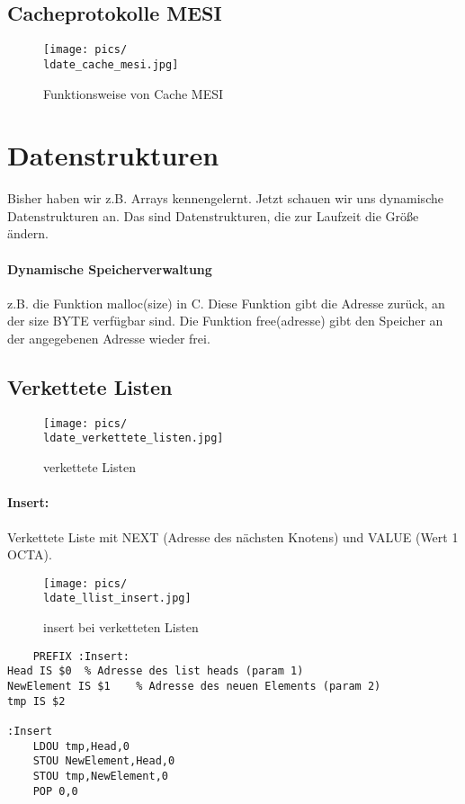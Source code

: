 \subsection{Cacheprotokolle MESI}
\begin{figure}[htbp]
\texttt{[image: pics/\\ldate\_cache\_mesi.jpg]}
\caption{Funktionsweise von Cache MESI}
\label{fig:cache_mesi}
\end{figure}

\section{Datenstrukturen}
Bisher haben wir z.B. Arrays kennengelernt. Jetzt schauen wir uns dynamische Datenstrukturen an. Das sind Datenstrukturen, die zur Laufzeit die Größe ändern. 
\paragraph{Dynamische Speicherverwaltung} z.B. die Funktion malloc(size) in C. Diese Funktion gibt die Adresse zurück, an der size BYTE verfügbar sind. Die Funktion free(adresse) gibt den Speicher an der angegebenen Adresse wieder frei. 

\subsection{Verkettete Listen} 

\begin{figure}[htbp]
\texttt{[image: pics/\\ldate\_verkettete\_listen.jpg]}
\caption{verkettete Listen}
\label{fig:verkettete_listen}
\end{figure}

\paragraph{Insert:} Verkettete Liste mit NEXT (Adresse des nächsten Knotens) und VALUE (Wert 1 OCTA). 

\begin{figure}[htbp]
\texttt{[image: pics/\\ldate\_llist\_insert.jpg]}
\caption{insert bei verketteten Listen}
\label{fig:llist_insert}
\end{figure}

\begin{lstlisting}
	PREFIX :Insert:
Head IS $0	% Adresse des list heads (param 1)
NewElement IS $1	% Adresse des neuen Elements (param 2)
tmp IS $2

:Insert
	LDOU tmp,Head,0
	STOU NewElement,Head,0
	STOU tmp,NewElement,0
	POP 0,0
\end{lstlisting}

